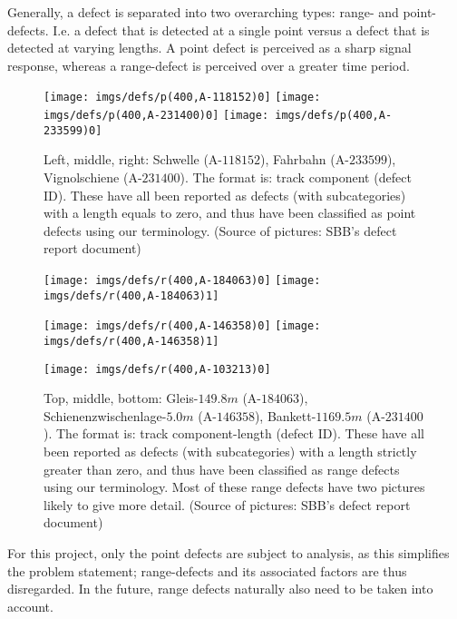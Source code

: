 Generally, a defect is separated into two overarching types: range- and point-defects. I.e. a defect that is detected at a single point versus a defect that is detected at varying lengths. A point defect is perceived as a sharp signal response, whereas a range-defect is perceived over a greater time period. 
\begin{figure}[H]
	\centering
	\texttt{[image: imgs/defs/p(400,A-118152)0]}
	\texttt{[image: imgs/defs/p(400,A-231400)0]}
	\texttt{[image: imgs/defs/p(400,A-233599)0]}
	\caption{Left, middle, right: Schwelle (A-$118152$), Fahrbahn (A-$233599$), Vignolschiene (A-$231400$). The format is: track component (defect ID). These have all been reported as defects (with subcategories) with a length equals to zero, and thus have been classified as point defects using our terminology. (Source of pictures: SBB's defect report document)}
\end{figure}
\raggedbottom
\begin{figure}[H]
	\centering
	\texttt{[image: imgs/defs/r(400,A-184063)0]}
	\texttt{[image: imgs/defs/r(400,A-184063)1]}
	
	\texttt{[image: imgs/defs/r(400,A-146358)0]}
	\texttt{[image: imgs/defs/r(400,A-146358)1]}
\end{figure}
\begin{figure}[H]
	\centering
	\texttt{[image: imgs/defs/r(400,A-103213)0]}
	\caption{Top, middle, bottom: Gleis-$149.8 m$ (A-$184063$), Schienenzwischenlage-$5.0 m$ (A-$146358$), Bankett-$1169.5 m$ (A-$231400$). The format is: track component-length (defect ID). These have all been reported as defects (with subcategories) with a length strictly greater than zero, and thus have been classified as range defects using our terminology. Most of these range defects have two pictures likely to give more detail. (Source of pictures: SBB's defect report document)}
\end{figure}
\raggedbottom %

For this project, only the point defects are subject to analysis, as this simplifies the problem statement; range-defects and its associated factors are thus disregarded. In the future, range defects naturally also need to be taken into account.

